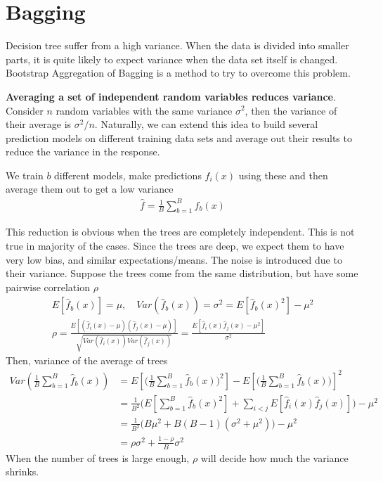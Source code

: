 \documentclass[../statistical_learning_notes.tex]{subfiles}
\begin{document}
    \section{Bagging}
    Decision tree suffer from a high variance. When the data is divided into smaller parts, it is quite likely to expect variance when the data set itself is changed. Bootstrap Aggregation of Bagging is a method to try to overcome this problem.\newline

    \textbf{Averaging a set of independent random variables reduces variance}. Consider $n$ random variables with the same variance $\sigma^{2}$, then the variance of their average is $\sigma^{2}/n$. Naturally, we can extend this idea to build several prediction models on different training data sets and average out their results to reduce the variance in the response.\newline

    We train $b$ different models, make predictions $\hat{f}_{i}(x)$ using these and then average them out to get a low variance
    \begin{align*}
        \hat{f} = \frac{1}{B}\sum_{b=1}^{B} \hat{f}_{b}(x)
    \end{align*}
    
    This reduction is obvious when the trees are completely independent. This is not true in majority of the cases. Since the trees are deep, we expect them to have very low bias, and similar expectations/means. The noise is introduced due to their variance. Suppose the trees come from the same distribution, but have some pairwise correlation $\rho$
    \begin{gather*}
        E[\hat{f}_{b}(x)] = \mu, \quad Var(\hat{f}_{b}(x)) = \sigma^{2} = E[\hat{f}_{b}(x)^{2}] - \mu^{2}\\
        \rho = \frac{E[(\hat{f}_{i}(x) - \mu)(\hat{f}_{j}(x) - \mu)]}{\sqrt{Var(\hat{f}_{i}(x))Var(\hat{f}_{j}(x))}} = \frac{E[\hat{f}_{i}(x)\hat{f}_{j}(x) - \mu^{2}]}{\sigma^{2}}
    \end{gather*}
    Then, variance of the average of trees
    \begin{align*}
        Var(\frac{1}{B} \sum_{b=1}^{B} \hat{f}_{b}(x)) &= E[\big(\frac{1}{B} \sum_{b=1}^{B} \hat{f}_{b}(x)\big)^{2}] - E[\big(\frac{1}{B} \sum_{b=1}^{B} \hat{f}_{b}(x)\big)]^{2}\\
        &= \frac{1}{B^{2}} \big(E[\sum_{b=1}^{B} \hat{f}_{b}(x)^{2}] + \sum_{i<j}E[\hat{f}_{i}(x)\hat{f}_{j}(x)] \big) - \mu^{2}\\
        &= \frac{1}{B^{2}}\big( B\mu^{2} + B(B-1)(\sigma^{2} + \mu^{2}) \big) - \mu^{2}\\
        &= \rho \sigma^{2} + \frac{1-\rho}{B} \sigma^{2} \tag{\theequation}\label{eq:var_avg_trees}
    \end{align*}
    When the number of trees is large enough, $\rho$ will decide how much the variance shrinks.\newline
\end{document}
